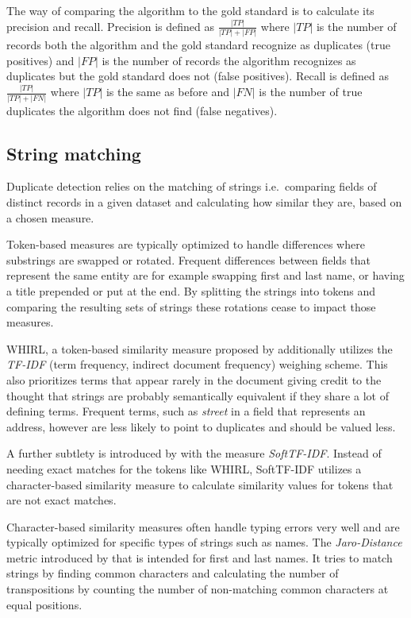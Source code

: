 \documentclass[conference]{IEEEtran}
\begin{document}
The way of comparing the algorithm to the gold standard is to calculate its precision and recall. Precision is defined as $\frac{|TP|}{|TP|+|FP|}$ where $|TP|$ is the number of records both the algorithm and the gold standard recognize as duplicates (true positives) and $|FP|$ is the number of records the algorithm recognizes as duplicates but the gold standard does not (false positives). Recall is defined as $\frac{|TP|}{|TP|+|FN|}$ where $|TP|$ is the same as before and $|FN|$ is the number of true duplicates the algorithm does not find (false negatives).

\subsection{String matching}
Duplicate detection relies on the matching of strings i.e.\ comparing fields of distinct records in a given dataset and calculating how similar they are, based on a chosen measure.

Token-based measures are typically optimized to handle differences where substrings are swapped or rotated. Frequent differences between fields that represent the same entity are for example swapping first and last name, or having a title prepended or put at the end. By splitting the strings into tokens and comparing the resulting sets of strings these rotations cease to impact those measures.

WHIRL, a token-based similarity measure proposed by \cite{Cohen.1998} additionally utilizes the \emph{TF-IDF} (term frequency, indirect document frequency) weighing scheme. This also prioritizes terms that appear rarely in the document giving credit to the thought that strings are probably semantically equivalent if they share a lot of defining terms. Frequent terms, such as \emph{street} in a field that represents an address, however are less likely to point to duplicates and should be valued less.

A further subtlety is introduced by \cite{Bilenko.2003} with the measure \emph{SoftTF-IDF}. Instead of needing exact matches for the tokens like WHIRL, SoftTF-IDF utilizes a character-based similarity measure to calculate similarity values for tokens that are not exact matches.

Character-based similarity measures often handle typing errors very well and are typically optimized for specific types of strings such as names. The \emph{Jaro-Distance} metric introduced by \autocite{Jaro.1978} that is intended for first and last names. It tries to match strings by finding common characters and calculating the number of transpositions by counting the number of non-matching common characters at equal positions.
\end{document}

